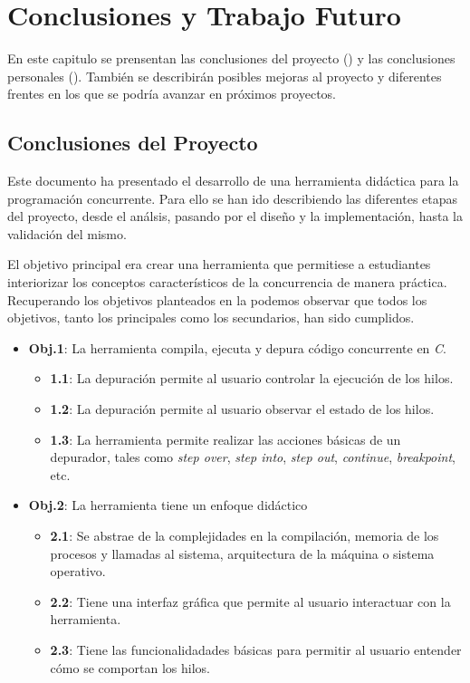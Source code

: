 \chapter{Conclusiones y Trabajo Futuro}\label{chap:conclusiones}
En este capitulo se prensentan las conclusiones del proyecto () y las conclusiones personales (). También se describirán posibles mejoras al proyecto y diferentes frentes en los que se podría avanzar en próximos proyectos.

\section{Conclusiones del Proyecto}\label{sec:conclusiones_proyecto}

Este documento ha presentado el desarrollo de una herramienta didáctica para la programación concurrente. Para ello se han ido describiendo las diferentes etapas del proyecto, desde el análsis, pasando por el diseño y la implementación, hasta la validación del mismo.

El objetivo principal era crear una herramienta que permitiese a estudiantes interiorizar los conceptos característicos de la concurrencia de manera práctica. Recuperando los objetivos planteados en la  podemos observar que todos los objetivos, tanto los principales como los secundarios, han sido cumplidos.

\begin{itemize}
    \item \textbf{Obj.1}: La herramienta compila, ejecuta y depura código concurrente en \textit{C}.
    \begin{itemize}
        \item \textbf{1.1}: La depuración permite al usuario controlar la ejecución de los hilos.
        \item \textbf{1.2}: La depuración permite al usuario observar el estado de los hilos.
        \item \textbf{1.3}: La herramienta permite realizar las acciones básicas de un depurador, tales como \textit{step over}, \textit{step into}, \textit{step out}, \textit{continue}, \textit{breakpoint}, etc.
    \end{itemize}
    
    \item \textbf{Obj.2}: La herramienta tiene un enfoque didáctico\label{obj:didactico}
    \begin{itemize}
        \item \textbf{2.1}: Se abstrae de la complejidades en la compilación, memoria de los procesos y llamadas al sistema, arquitectura de la máquina o sistema operativo.
        \item \textbf{2.2}: Tiene una interfaz gráfica que permite al usuario interactuar con la herramienta.
        \item \textbf{2.3}: Tiene las funcionalidadades básicas para permitir al usuario entender cómo se comportan los hilos.
    \end{itemize}
\end{itemize}

